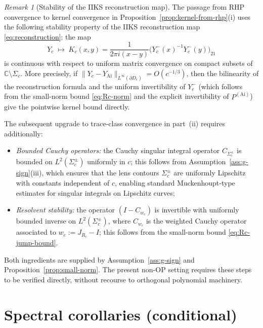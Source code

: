 \documentclass[12pt,a4paper]{amsart}
\theoremstyle{definition}
\theoremstyle{remark}
\newtheorem{remark}[theorem]{Remark}
\begin{document}
\begin{remark}[Stability of the IIKS reconstruction map]
\label{rem:reconstruction-stability}
The passage from RHP convergence to kernel convergence in
Proposition~\ref{prop:kernel-from-rhp}(i) uses the following
stability property of the IIKS reconstruction map
\eqref{eq:reconstruction}: the map
\[
  Y_c \;\longmapsto\;
  K_c(x,y) = \frac{1}{2\pi i(x-y)}\bigl(Y_c^-(x)^{-1}Y_c^-(y)\bigr)_{21}
\]
is continuous with respect to uniform matrix convergence on
compact subsets of $\mathbb{C}\setminus\Sigma_c$.
More precisely, if $\|Y_c - Y_{\mathrm{Ai}}\|_{L^\infty(\partial D_\epsilon)}
= O(c^{-1/3})$, then the bilinearity of the reconstruction formula
and the uniform invertibility of $Y_c^-$ (which follows from the
small-norm bound \eqref{eq:Rc-norm} and the explicit invertibility
of $P^{(\mathrm{Ai})}$) give the pointwise kernel bound directly.

The subsequent upgrade to trace-class convergence in part~(ii) requires
additionally:
\begin{itemize}
\item \emph{Bounded Cauchy operators:}
  the Cauchy singular integral operator $C_{\Sigma_c^\pm}$ is bounded
  on $L^2(\Sigma_c^\pm)$ uniformly in $c$; this follows from
  Assumption~\ref{ass:g-sign}(iii), which ensures that the lens
  contours $\Sigma_c^\pm$ are uniformly Lipschitz with constants
  independent of $c$, enabling standard Muckenhoupt-type estimates
  for singular integrals on Lipschitz curves;
\item \emph{Resolvent stability:}
  the operator $(I - C_{w_c})$ is invertible with uniformly bounded
  inverse on $L^2(\Sigma_c^\pm)$, where $C_{w_c}$ is the weighted
  Cauchy operator associated to $w_c := J_{R_c} - I$; this follows
  from the small-norm bound \eqref{eq:Rc-jump-bound}.
\end{itemize}
Both ingredients are supplied by Assumption~\ref{ass:g-sign} and
Proposition~\ref{prop:small-norm}. The present non-OP setting
requires these steps to be verified directly, without recourse to
orthogonal polynomial machinery.
\end{remark}

\section{Spectral corollaries (conditional)}
\label{sec:corollaries}
\end{document}
